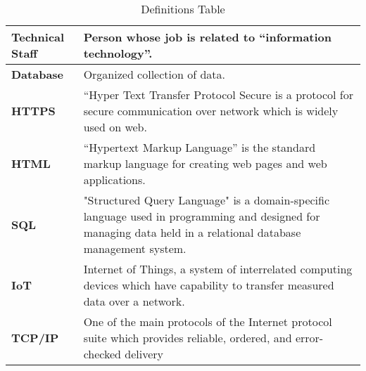 \begin{table}[H]
    \centering
    \begin{tabular}{ | l | p{10cm} |}
    \hline
    \textbf{Technical Staff}    & Person whose job is related to “information technology”. \\
    \hline
    \textbf{Database}           & Organized collection of data. \\
    \hline
    \textbf{HTTPS}      & “Hyper Text Transfer Protocol Secure is a protocol for secure communication over network which is widely used on web.\\
    \hline
    \textbf{HTML}             & “Hypertext Markup Language” is the standard markup language for creating web pages and web applications. \\
    \hline
    \textbf{SQL}    & "Structured Query Language" is a domain-specific language used in programming and designed for managing data held in a relational database management system. \\
    \hline
    \textbf{IoT}         & Internet of Things, a system of interrelated computing devices which have capability to transfer measured data over a network. \\
    \hline
    \textbf{TCP/IP}         & One of the main protocols of the Internet protocol suite which provides reliable, ordered, and error-checked delivery \\
    \hline
    \end{tabular}
    \label{tab:defitinions}
    \caption{Definitions Table}
\end{table}
